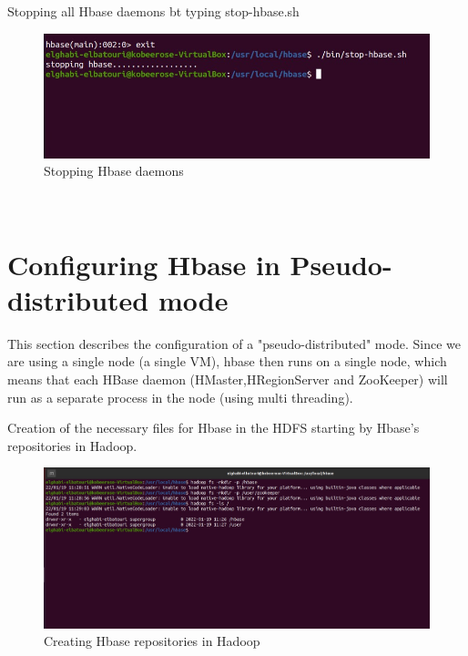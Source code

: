 \begin{spacing}{1.2}
\par Stopping all Hbase daemons bt typing stop-hbase.sh
\\
\begin{figure}[!htb] 
\begin{center} 
\includegraphics[width=1\linewidth]{Pictures/HBase/Configuring Hbase in Standalone & Pseudo-distributed mode/Configuring Hbase in Standalone mode/Stopping Hbase daemons} 
\end{center} 
\caption{Stopping Hbase daemons} 
\end{figure}  \FloatBarrier
\\


\section{Configuring Hbase in Pseudo-distributed mode }
\par This section describes the configuration of a "pseudo-distributed" mode. Since we are using a single node (a single VM), hbase then runs on a single node, which means that each HBase daemon (HMaster,HRegionServer and ZooKeeper) will run as a separate process in the node (using multi threading).
\\

\par Creation of the necessary files for Hbase in the HDFS starting by Hbase's repositories in Hadoop.
\\
\begin{figure}[!htb] 
\begin{center} 
\includegraphics[width=1\linewidth]{Pictures/HBase/Configuring Hbase in Standalone & Pseudo-distributed mode/Configuring Hbase in Standalone mode/Creating Hbase repositories in Hadoop} 
\end{center} 
\caption{Creating Hbase repositories in Hadoop} 
\end{figure}  \FloatBarrier
\\


\end{spacing}
